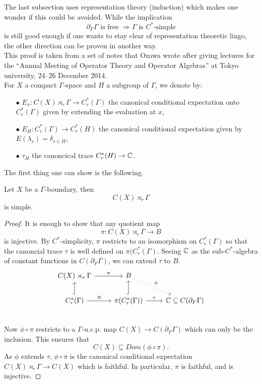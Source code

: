The last subsection uses representation theory (induction) which makes one wonder if this could be avoided. While the implication 
\[\partial_F \Gamma \text{ is free } \Rightarrow	 \Gamma \text{ is }C^*\text{-simple}\]
is still good enough if one wants to stay clear of representation theoretic lingo, the other direction can be proven in another way.\\

This proof is taken from a set of notes that Ozawa wrote after giving lectures for the ``Annual Meeting of Operator Theory and Operator Algebras” at Tokyo university, 24–26 December 2014.\\

For $X$ a compact $\Gamma$-space and $H$ a subgroup of $\Gamma$, we denote by:\\

\begin{itemize}
\item[$\bullet$] $E_x : C(X)\rtimes_r \Gamma \rightarrow C^*_r(\Gamma)$ the canonical conditional expectation onto $C_r^*(\Gamma)$ given by extending the evaluation at $x$,   \\
\item[$\bullet$] $E_H : C^*_r(\Gamma) \rightarrow C^*_r(H)$ the canonical conditional expectation given by $E(\lambda_s) = \delta_{s\in H}$,\\
\item[$\bullet$] $\tau_H$ the canoncical trace $C^*_r(H) \rightarrow \mathbb C$.\\
\end{itemize} 

The first thing one can show is the following.

\begin{prop}
Let $X$ be a $\Gamma$-boundary, then 
\[C(X)\rtimes_r \Gamma\]
is simple.
\end{prop}

\begin{proof}
It is enough to show that any quotient map
\[\pi: C(X)\rtimes_r \Gamma \rightarrow B\]
is injective. By $C^*$-simplicity, $\pi$ restricts to an isomorphism on $C^*_{r}(\Gamma)$ so that the canoncial trace $\tau$ is well defined on $\pi(C_r^*(\Gamma)$. Seeing $\mathbb C$ as the sub-$C^*$-algebra of constant functions in $C(\partial_F \Gamma)$, we can extend $\tau$ to $B$.
\[\begin{tikzcd}
C(X)\rtimes_r \Gamma \arrow{r}{\pi}                     &                  B  \arrow[dotted]{rd}{\phi}                 &                                   \\
C^*_r(\Gamma) \arrow{r}{\cong}\arrow[hookrightarrow]{u} &  \pi(C^*_r(\Gamma)) \arrow{r}{\tau} \arrow[hookrightarrow]{u}& \C \subseteq C(\partial_F \Gamma) \\
\end{tikzcd}\]
Now $\phi \circ \pi $ restricts to a $\Gamma$-u.c.p. map $C(X)\rightarrow C(\partial_F \Gamma)$ which can only be the inclusion. This ensures that 
\[ C(X) \subseteq Dom(\phi \circ \pi). \]
As $\phi$ extends $\tau$, $\phi \circ \pi$ is the canonical conditional expectation $C(X)\rtimes_r \Gamma \rightarrow C(X)$ which is faithful. In particular, $\pi$ is faithful, and is injective.  
\end{proof}

